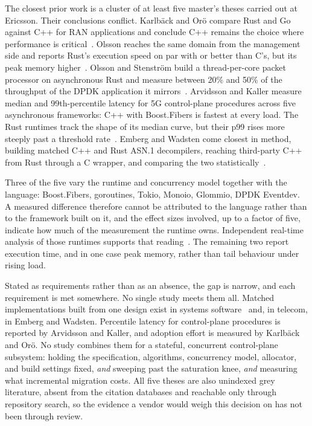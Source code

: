 \documentclass[11pt,a4paper]{article}
\begin{document}
The closest prior work is a cluster of at least five master's theses carried
out at Ericsson. Their conclusions conflict. Karlb\"ack and Or\"o compare Rust and Go against C++ for RAN
applications and conclude C++ remains the choice where performance is
critical~\cite{karlback2021ran}. Olsson reaches the same domain from the
management side and reports Rust's execution speed on par with or better than
C's, but its peak memory higher~\cite{olsson2023ranmgmt}. Olsson and
Stenstr\"om build a thread-per-core packet processor on asynchronous Rust and
measure between 20\% and 50\% of the throughput of the DPDK application it
mirrors~\cite{olsson2023asyncpackets}. Arvidsson and Kaller measure median and
99th-percentile latency for 5G control-plane procedures across five
asynchronous frameworks: C++ with Boost.Fibers is fastest at every load. The
Rust runtimes track the shape of its median curve, but their p99 rises more
steeply past a threshold rate~\cite{arvidsson2025async}. Emberg and Wadsten
come closest in method, building matched C++ and Rust ASN.1 decompilers,
reaching third-party C++ from Rust through a C wrapper, and comparing the two
statistically~\cite{emberg2023asn1}.

Three of the five vary the runtime and concurrency model together with the
language: Boost.Fibers, goroutines, Tokio, Monoio, Glommio, DPDK Eventdev. A
measured difference therefore cannot be attributed to the language rather than
to the framework built on it, and the effect sizes involved, up to a factor of
five, indicate how much of the measurement the runtime owns. Independent
real-time analysis of those runtimes supports that
reading~\cite{skoudlil2025asyncrust}. The remaining two report execution time,
and in one case peak memory, rather than tail behaviour under rising load.

Stated as requirements rather than as an absence, the gap is narrow, and each
requirement is met somewhere. No single study meets them all. Matched implementations built from one design
exist in systems
software~\cite{emmerich2019drivers,li2021ipc,suchert2023stamp,gonzalez2023rustudp}
and, in telecom, in Emberg and Wadsten. Percentile latency for control-plane
procedures is reported by Arvidsson and Kaller, and adoption effort is measured by
Karlb\"ack and Or\"o. No study combines them for a stateful, concurrent
control-plane subsystem: holding the specification, algorithms, concurrency
model, allocator, and build settings fixed, \emph{and} sweeping past the
saturation knee, \emph{and} measuring what incremental migration costs. All
five theses are also unindexed grey literature, absent from the citation
databases and reachable only through repository search, so the evidence a
vendor would weigh this decision on has not been through review.
\end{document}

